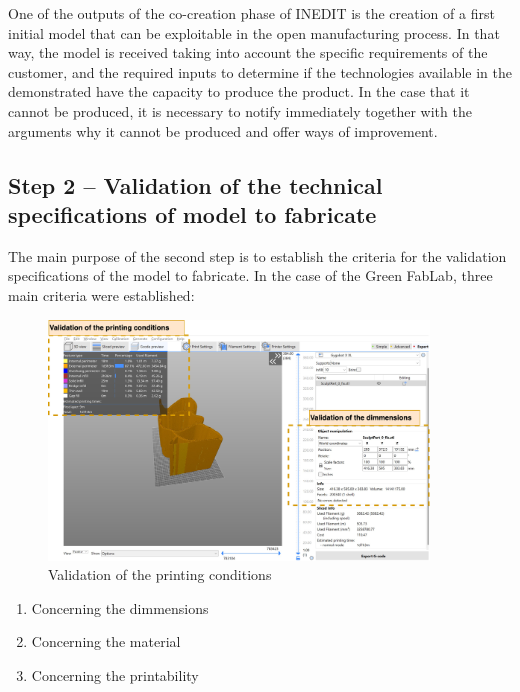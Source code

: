 \documentclass[
  11pt,
]{article}
\providecommand{\tightlist}{%
  \setlength{\itemsep}{0pt}\setlength{\parskip}{0pt}}\usepackage{longtable,booktabs,array}
\begin{document}
One of the outputs of the co-creation phase of INEDIT is the creation of
a first initial model that can be exploitable in the open manufacturing
process. In that way, the model is received taking into account the
specific requirements of the customer, and the required inputs to
determine if the technologies available in the demonstrated have the
capacity to produce the product. In the case that it cannot be produced,
it is necessary to notify immediately together with the arguments why it
cannot be produced and offer ways of improvement.

\hypertarget{step-2-validation-of-the-technical-specifications-of-model-to-fabricate}{%
\subsection{Step 2 -- Validation of the technical specifications of
model to
fabricate}\label{step-2-validation-of-the-technical-specifications-of-model-to-fabricate}}

The main purpose of the second step is to establish the criteria for the
validation specifications of the model to fabricate. In the case of the
Green FabLab, three main criteria were established:

\begin{figure}[H]

{\centering \includegraphics[width=0.9\textwidth,height=\textheight]{figures/Step-2.png}

}

\caption{\label{fig-step2}Validation of the printing conditions}

\end{figure}

\begin{enumerate}
\def\labelenumi{\arabic{enumi}.}
\tightlist
\item
  Concerning the dimmensions
\item
  Concerning the material
\item
  Concerning the printability
\end{enumerate}
\end{document}
